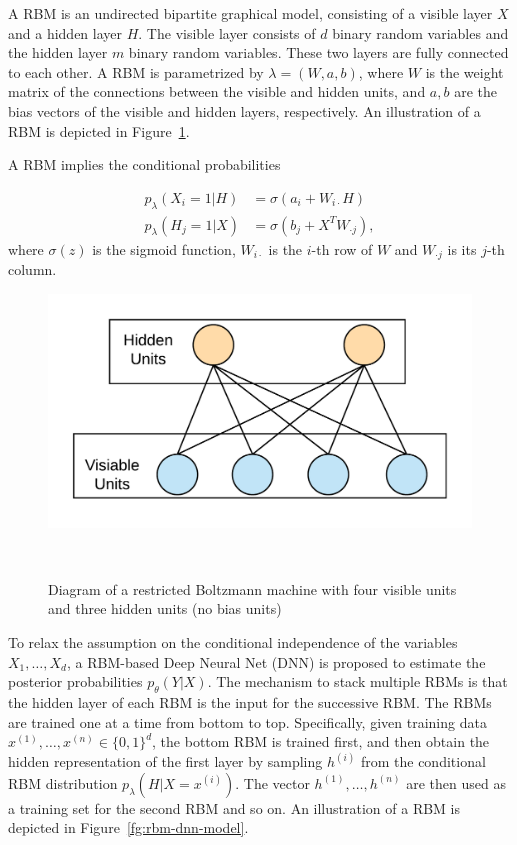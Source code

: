\documentclass{article}
\begin{document}
A RBM is an undirected bipartite graphical model, consisting of a
visible layer $X$ and a hidden layer $H$. The visible layer consists
of $d$ binary random variables and the hidden layer $m$ binary random
variables. These two layers are fully connected to each other. A RBM
is parametrized by $\lambda = (W, a, b)$, where $W$ is the weight
matrix of the connections between the visible and hidden units, and
$a,b$ are the bias vectors of the visible and hidden layers,
respectively. An illustration of a RBM is depicted in Figure~\ref{fg:rbm_model}.

A RBM implies the conditional probabilities

\begin{align*}
p_{\lambda}(X_i=1|H) &= \sigma (a_i+W_{i\cdot}H) \\
p_{\lambda}(H_j=1|X) &= \sigma (b_j+X^{T}W_{\cdot j}),
\end{align*}
where $\sigma (z)$ is the sigmoid function, $W_{i\cdot}$ is the $i$-th
row of $W$ and $W_{\cdot j}$ is its $j$-th column.
\begin{figure}[h]
  \centering
  \includegraphics[width=0.95\columnwidth]{rbm.png}
  \caption{Diagram of a restricted Boltzmann machine with four visible
  units and three hidden units (no bias units)} ~\label{fg:rbm_model}
\end{figure}

To relax the assumption on the conditional independence of the
variables $X_1,\ldots,X_d$, a RBM-based Deep Neural Net (DNN) is
proposed to estimate the posterior probabilities
$p_{\theta}(Y|X)$. The mechanism to stack multiple RBMs is that the
hidden layer of each RBM is the input for the successive RBM. The RBMs
are trained one at a time from bottom to top. Specifically, given
training data $x^{(1)}, \ldots, x^{(n)} \in \{ 0,1 \}^d$, the bottom
RBM is trained first, and then obtain the hidden representation of the
first layer by sampling $h^{(i)}$ from the conditional RBM
distribution $p_{\lambda}(H|X=x^{(i)})$. The vector $h^{(1)}, \ldots,
h^{(n)}$ are then used as a training set for the second RBM and so
on. An illustration of a RBM is depicted in Figure~\ref{fg:rbm-dnn-model}.
\end{document}
